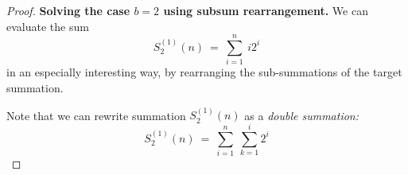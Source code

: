 \begin{proof}
{\bf Solving the case $b=2$ using subsum rearrangement.}
%
We can evaluate the sum
\[
S_2^{(1)}(n) \ = \ \sum_{i=1}^n \ i 2^i
\]
in an especially interesting way, by rearranging the sub-summations of
the target summation.
\medskip

\noindent {}
\medskip

Note that we can rewrite summation $S_2^{(1)}(n)$ as a {\em double
  summation:}
\begin{equation}
\label{eq:geom-double-sum}
S_2^{(1)}(n) \ = \ \sum_{i=1}^n \ \sum_{k=1}^{i} 2^i
\end{equation}


\end{proof}
